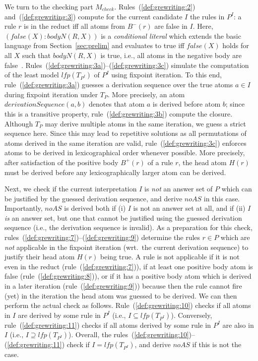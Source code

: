 \documentclass[11pt,fleqn,twoside]{article}
\newcommand{\Program}{\ensuremath{P}}
\begin{document}
			We turn to the checking part $M_{\mathit{check}}$.
			Rules~(\ref{def:grewriting:2}) and~(\ref{def:grewriting:3}) compute for the current candidate $I$ the rules in $P^I$:
			a rule $r$ is in the reduct iff all atoms from $B^{-}(r)$ are false in $I$.
			Here, $(\mathit{false}(X) : \mathit{bodyN}(R,X))$ is a \emph{conditional literal} which extends the basic language from Section~\ref{sec:prelim}
			and evaluates to true iff $\mathit{false}(X)$ holds for all $X$ such that $\mathit{bodyN}(R,X)$ is true,
			i.e., all atoms in the negative body are false~\cite{gekakasc12a}.
			Rules~(\ref{def:grewriting:3a})--(\ref{def:grewriting:3c}) simulate the computation of the least model $\mathit{lfp}(T_{P^I})$ of $P^I$ using fixpoint iteration.
			To this end, rule~(\ref{def:grewriting:3a}) guesses a derivation sequence over the true atoms $a \in I$ during fixpoint iteration under $T_P$.
			More precisely, an atom $\mathit{derivationSequence}(a,b)$ denotes that atom $a$ is derived before atom $b$; since this is a transitive property,
			rule~(\ref{def:grewriting:3b}) compute the closure.
			Although $T_P$ may derive multiple atoms in the same iteration, we guess a strict sequence here.
			Since this may lead to repetitive solutions as all permutations of atoms derived in the same iteration
			are valid, rule~(\ref{def:grewriting:3c}) enforces atoms to be derived in lexicographical order whenever possible.
			More precisely, after satisfaction of the positive body $B^{+}(r)$ of a rule $r$, the head atom $H(r)$
			must be derived before any lexicographically larger atom can be derived.
			
			Next, we check if the current interpretation $I$ is \emph{not}
			an answer set of $\Program$ which can be justified by the guessed derivation sequence, and derive $\mathit{noAS}$ in this case.
			Importantly, $\mathit{noAS}$ is derived both if (i) $I$ is not an answer set at all, and if (ii) $I$ \emph{is} an answer set,
			but one that cannot be justified using the guessed derivation sequence (i.e., the derivation sequence is invalid).
			As a preparation for this check,
			rules~(\ref{def:grewriting:7})--(\ref{def:grewriting:9}) determine the rules $r \in P$ which
			are \emph{not} applicable in the fixpoint iteration (wrt.~the current derivation sequence) to justify their head atom $H(r)$ being true.
			A rule is not applicable if it is not even in the reduct (rule~(\ref{def:grewriting:7})),
			if at least one positive body atom is false (rule~(\ref{def:grewriting:8})),
			or if it has a positive body atom which is derived in a
			later iteration (rule~(\ref{def:grewriting:9})) because then the rule cannot fire (yet)
			in the iteration the head atom was guessed to be derived.
			We can then perform the actual check as follows.
			Rule~(\ref{def:grewriting:10}) checks if all atoms in $I$ are derived
			by some rule in $P^I$ (i.e., $I \subseteq \mathit{lfp}(T_{P^I})$).
			Conversely, rule~(\ref{def:grewriting:11})
			checks if all atoms derived by some rule in $P^I$ are also in $I$ (i.e., $I \supseteq \mathit{lfp}(T_{P^I})$).
			Overall, the rules~(\ref{def:grewriting:10})--(\ref{def:grewriting:11}) check if $I = \mathit{lfp}(T_{P^I})$,
			and derive $\mathit{noAS}$ if this is not the case.
\end{document}
